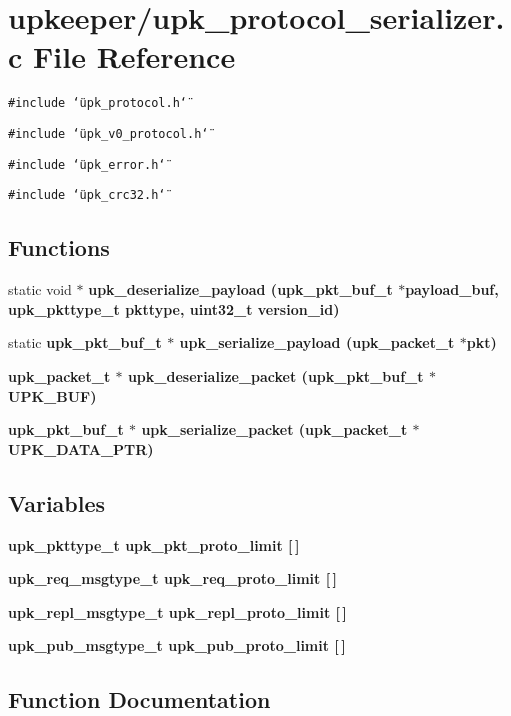 \section{upkeeper/upk\_\-protocol\_\-serializer.c File Reference}
\label{upk__protocol__serializer_8c}
{\tt \#include \char`\"{}upk\_\-protocol.h\char`\"{}}\par
{\tt \#include \char`\"{}upk\_\-v0\_\-protocol.h\char`\"{}}\par
{\tt \#include \char`\"{}upk\_\-error.h\char`\"{}}\par
{\tt \#include \char`\"{}upk\_\-crc32.h\char`\"{}}\par
\subsection*{Functions}
\begin{CompactItemize}
\item 
static void $\ast$ \bf{upk\_\-deserialize\_\-payload} (\bf{upk\_\-pkt\_\-buf\_\-t} $\ast$payload\_\-buf, \bf{upk\_\-pkttype\_\-t} pkttype, uint32\_\-t version\_\-id)
\item 
static \bf{upk\_\-pkt\_\-buf\_\-t} $\ast$ \bf{upk\_\-serialize\_\-payload} (\bf{upk\_\-packet\_\-t} $\ast$pkt)
\item 
\bf{upk\_\-packet\_\-t} $\ast$ \bf{upk\_\-deserialize\_\-packet} (\bf{upk\_\-pkt\_\-buf\_\-t} $\ast$UPK\_\-BUF)
\item 
\bf{upk\_\-pkt\_\-buf\_\-t} $\ast$ \bf{upk\_\-serialize\_\-packet} (\bf{upk\_\-packet\_\-t} $\ast$UPK\_\-DATA\_\-PTR)
\end{CompactItemize}
\subsection*{Variables}
\begin{CompactItemize}
\item 
\bf{upk\_\-pkttype\_\-t} \bf{upk\_\-pkt\_\-proto\_\-limit} [$\,$]
\item 
\bf{upk\_\-req\_\-msgtype\_\-t} \bf{upk\_\-req\_\-proto\_\-limit} [$\,$]
\item 
\bf{upk\_\-repl\_\-msgtype\_\-t} \bf{upk\_\-repl\_\-proto\_\-limit} [$\,$]
\item 
\bf{upk\_\-pub\_\-msgtype\_\-t} \bf{upk\_\-pub\_\-proto\_\-limit} [$\,$]
\end{CompactItemize}


\subsection{Function Documentation}
